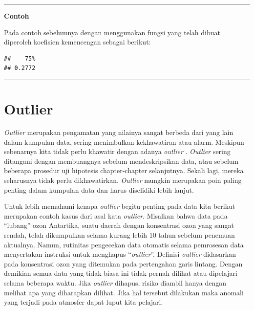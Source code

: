 \documentclass[]{book}
\newenvironment{Shaded}{\begin{snugshade}}{\end{snugshade}}
\newcommand{\KeywordTok}[1]{\textcolor[rgb]{0.13,0.29,0.53}{\textbf{#1}}}
\newcommand{\OperatorTok}[1]{\textcolor[rgb]{0.81,0.36,0.00}{\textbf{#1}}}
\newcommand{\NormalTok}[1]{#1}
\begin{document}
\begin{center}\rule{0.5\linewidth}{\linethickness}\end{center}

\textbf{Contoh}

Pada contoh sebelumnya dengan menggunakan fungsi yang telah dibuat
diperoleh koefisien kemencengan sebagai berikut:

\begin{Shaded}
\end{Shaded}

\begin{verbatim}
##    75% 
## 0.2772
\end{verbatim}

\begin{center}\rule{0.5\linewidth}{\linethickness}\end{center}

\section{Outlier}\label{outlier}

\emph{Outlier} merupakan pengamatan yang nilainya sangat berbeda dari
yang lain dalam kumpulan data, sering menimbulkan kekhawatiran atau
alarm. Meskipun sebenarnya kita tidak perlu khawatir dengan adanya
\emph{outlier} . \emph{Outlier} sering ditangani dengan membuangnya
sebelum mendeskripsikan data, atau sebelum beberapa prosedur uji
hipotesis chapter-chapter selanjutnya. Sekali lagi, mereka seharusnya
tidak perlu dikhawatirkan. \emph{Outlier} mungkin merupakan poin paling
penting dalam kumpulan data dan harus diselidiki lebih lanjut.

Untuk lebih memahami kenapa \emph{outlier} begitu penting pada data kita
berikut merupakan contoh kasus dari asal kata \emph{outlier}. Misalkan
bahwa data pada ``lubang'' ozon Antartika, suatu daerah dengan
konsentrasi ozon yang sangat rendah, telah dikumpulkan selama kurang
lebih 10 tahun sebelum penemuan aktualnya. Namun, rutinitas pengecekan
data otomatis selama pemrosesan data menyertakan instruksi untuk
menghapus ``\emph{outlier}''. Definisi \emph{outlier} didasarkan pada
konsentrasi ozon yang ditemukan pada pertengahan garis lintang. Dengan
demikian semua data yang tidak biasa ini tidak pernah dilihat atau
dipelajari selama beberapa waktu. Jika \emph{outlier} dihapus, risiko
diambil hanya dengan melihat apa yang diharapkan dilihat. Jika hal
tersebut dilakukan maka anomali yang terjadi pada atmosfer dapat luput
kita pelajari.
\end{document}
